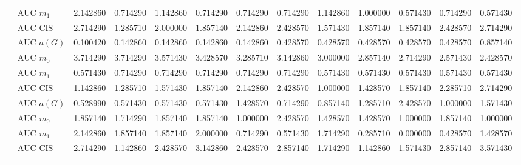 \begin{table}[htbp]
\begin{tabular}{llrrrrrrrrrrr}
    & AUC $m_1$ & 2.142860 & 0.714290 & 1.142860 & 0.714290 & 0.714290 & 0.714290 & 1.142860 & 1.000000 & 0.571430 & 0.714290 & 0.571430 \\
    & AUC CIS & 2.714290 & 1.285710 & 2.000000 & 1.857140 & 2.142860 & 2.428570 & 1.571430 & 1.857140 & 1.857140 & 2.428570 & 2.714290 \\
    \addlinespace
    \multirow{4}{*}{degree} & AUC $a(G)$ & 0.100420 & 0.142860 & 0.142860 & 0.142860 & 0.142860 & 0.428570 & 0.428570 & 0.428570 & 0.428570 & 0.428570 & 0.857140 \\
    & AUC $m_0$ & 3.714290 & 3.714290 & 3.571430 & 3.428570 & 3.285710 & 3.142860 & 3.000000 & 2.857140 & 2.714290 & 2.571430 & 2.428570 \\
    & AUC $m_1$ & 0.571430 & 0.714290 & 0.714290 & 0.714290 & 0.714290 & 0.714290 & 0.571430 & 0.571430 & 0.571430 & 0.571430 & 0.571430 \\
    & AUC CIS & 1.142860 & 1.285710 & 1.571430 & 1.857140 & 2.142860 & 2.428570 & 1.000000 & 1.428570 & 1.857140 & 2.285710 & 2.714290 \\
    \addlinespace
    \multirow{4}{*}{random} & AUC $a(G)$ & 0.528990 & 0.571430 & 0.571430 & 0.571430 & 1.428570 & 0.714290 & 0.857140 & 1.285710 & 2.428570 & 1.000000 & 1.571430 \\
    & AUC $m_0$ & 1.857140 & 1.714290 & 1.857140 & 1.857140 & 1.000000 & 2.428570 & 1.428570 & 1.428570 & 1.000000 & 1.857140 & 1.000000 \\
    & AUC $m_1$ & 2.142860 & 1.857140 & 1.857140 & 2.000000 & 0.714290 & 0.571430 & 1.714290 & 0.285710 & 0.000000 & 0.428570 & 1.428570 \\
    & AUC CIS & 2.714290 & 1.142860 & 2.428570 & 3.142860 & 2.428570 & 2.857140 & 1.714290 & 1.142860 & 1.571430 & 2.857140 & 3.571430 \\
    \addlinespace
    \bottomrule
  \end{tabular}
\end{table}

